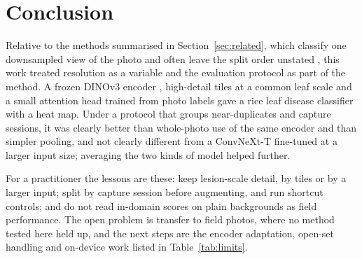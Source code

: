 \section{Conclusion}
\label{sec:conclusion}

Relative to the methods summarised in Section~\ref{sec:related}, which classify one downsampled view of the photo and often
leave the split order unstated \cite{xu2024}, this work treated resolution as a variable and the evaluation protocol as part
of the method. A frozen DINOv3 encoder \cite{simeoni2025dinov3}, high-detail tiles at a common leaf scale and a small
attention head \cite{ilse2018} trained from photo labels gave a rice leaf disease classifier with a heat map. Under a
protocol that groups near-duplicates and capture sessions, it was clearly better than whole-photo use of the same encoder and
than simpler pooling, and not clearly different from a ConvNeXt-T fine-tuned at a larger input size; averaging the two kinds of
model helped further.

For a practitioner the lessons are these: keep lesion-scale detail, by tiles or by a larger input; split by capture session
before augmenting, and run shortcut controls; and do not read in-domain scores on plain backgrounds as field performance. The
open problem is transfer to field photos, where no method tested here held up, and the next steps are the encoder adaptation,
open-set handling and on-device work listed in Table~\ref{tab:limits}.
